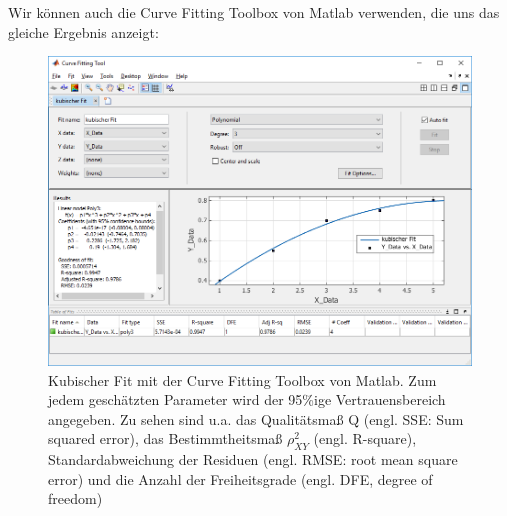 Wir können auch die Curve Fitting Toolbox von Matlab 
verwenden, die uns das gleiche Ergebnis anzeigt:
\begin{figure}[!htp]
	\begin{center}
		\includegraphics[width=150mm]{02_vorlesung/media/Matlab_CFTool_Kubischer_Fit.png}
		\caption{Kubischer Fit mit der Curve Fitting Toolbox von Matlab. 
			Zum jedem geschätzten Parameter wird der 95\%ige Vertrauensbereich 
			angegeben. Zu sehen sind u.a. das Qualitätsmaß Q (engl. SSE: Sum squared error), das Bestimmtheitsmaß $\rho^2_{XY}$ (engl. R-square), Standardabweichung der Residuen (engl. RMSE: root mean square error) und die Anzahl der Freiheitsgrade (engl. DFE, degree of freedom)}
		\label{fig:CFTool_kubischerFit}
	\end{center}
\end{figure}
\newpage


